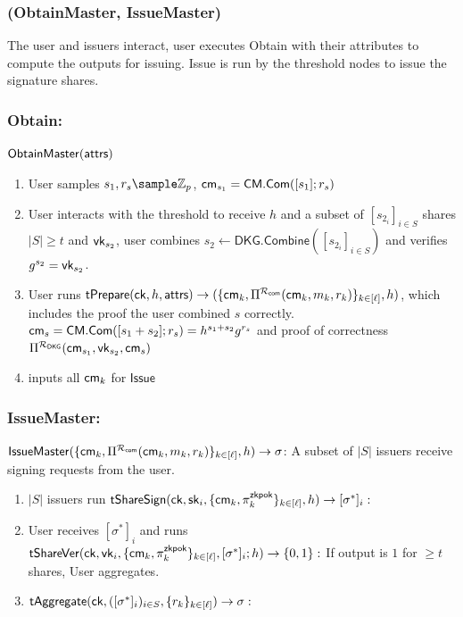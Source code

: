 \subsubsection*{(ObtainMaster, IssueMaster)}
The user and issuers interact, user executes Obtain with their attributes to compute the outputs for issuing. Issue is run by the threshold nodes to issue the signature shares.
\subsubsection*{Obtain:}
$\mathsf{ObtainMaster}(\mathsf{attrs})$
\begin{enumerate}
    \item User samples $s_1, r_s \sample \Z_p$, $\mathsf{cm}_{s_1} = \mathsf{CM.Com}([s_1];r_s)$
    \item User interacts with the threshold to receive $h$ and a subset of $[s_{2_i}]_{i \in S}$ shares $|S| \geq t$ and $\mathsf{vk}_{s_2}$, user combines $s_2 \gets \mathsf{DKG.Combine}([s_{2_i}]_{i \in S})$ and verifies $g^{s_2} = \mathsf{vk}_{s_2}$. 
    \item User runs $\mathsf{tPrepare}(\mathsf{ck}, h, \mathsf{attrs}) \to (\{\mathsf{cm}_k, \Pi^{\mathcal{R}_{\mathsf{com}}}(\mathsf{cm}_k, m_k, r_k)\}_{k \in [\ell]}, h)$, which includes the proof the user combined $s$ correctly. $\mathsf{cm}_s = \mathsf{CM.Com}([s_1 + s_2];r_s) = h^{s_1 + s_2}g^{r_s}$ and proof of correctness $\Pi^{\mathcal{R}_{\mathsf{DKG}}}(\mathsf{cm}_{s_1},  \mathsf{vk}_{s_2}, \mathsf{cm}_s)$
    \item inputs all $\mathsf{cm}_k$ for $\mathsf{Issue}$
\end{enumerate}

\subsubsection{IssueMaster:}
$\mathsf{IssueMaster}(\{\mathsf{cm}_k, \Pi^{\mathcal{R}_{\mathsf{com}}}(\mathsf{cm}_k, m_k, r_k)\}_{k \in [\ell]}, h) \to \sigma$: A subset of $|S|$ issuers receive signing requests from the user. 
\begin{enumerate}
    \item $|S|$ issuers run $\mathsf{tShareSign}(\mathsf{ck}, \mathsf{sk}_i, \{\mathsf{cm}_k, \pi_k^{\mathsf{zkpok}}\}_{k \in [\ell]}, h) \to [\sigma^*]_i:$
    \item User receives $[\sigma^*]_i$ and runs $\mathsf{tShareVer}(\mathsf{ck}, \mathsf{vk}_i, \{\mathsf{cm}_k, \pi_k^{\mathsf{zkpok}}\}_{k \in [\ell]}, [\sigma^*]_i; h) \to \{0,1\}:$ If output is $1$ for $\geq t$ shares, User aggregates.
    \item $\mathsf{tAggregate}(\mathsf{ck}, ([\sigma^*]_i)_{i \in S}, \{r_k\}_{k \in [\ell]}) \to \sigma:$
\end{enumerate}

